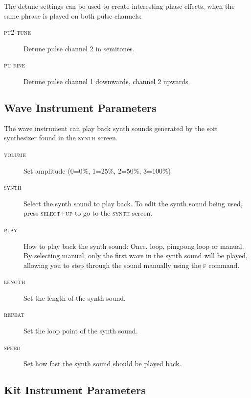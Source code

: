 The detune settings can be used to create interesting phase effects, when the same phrase is played on both pulse channels:

\begin{description}
	\item[\textsc{pu2 tune}] Detune pulse channel 2 in semitones.
	\item[\textsc{pu fine}] Detune pulse channel 1 downwards, channel 2 upwards.
\end{description}

\subsection{Wave Instrument Parameters}

The wave instrument can play back synth sounds generated by the soft synthesizer found in the \textsc{synth} screen.

\begin{figure}[hbtp]
	\begin{center}
	\end{center}
\end{figure}

\begin{description}
	\item[\textsc{volume}] Set amplitude (0=0\%, 1=25\%, 2=50\%, 3=100\%)
	\item[\textsc{synth}] Select the synth sound to play back. To edit the synth sound being used, press \textsc{select+up} to go to the \textsc{synth} screen.
	\item[\textsc{play}] How to play back the synth sound: Once, loop, pingpong loop or manual. By selecting manual, only the first wave in the synth sound will be played, allowing you to step through the sound manually using the \textsc{f} command.
	\item[\textsc{length}] Set the length of the synth sound.
	\item[\textsc{repeat}] Set the loop point of the synth sound.
	\item[\textsc{speed}] Set how fast the synth sound should be played back.
\end{description}

\subsection{Kit Instrument Parameters}

